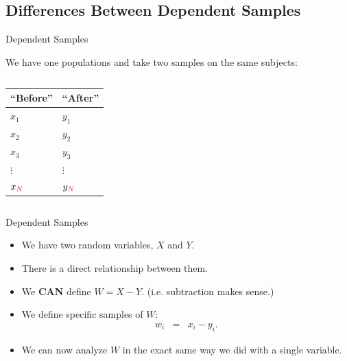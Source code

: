 \subsection{Differences Between Dependent Samples}


\begin{frame}{Dependent Samples}

  We have one populations and take two samples on the same subjects: \\
  \begin{columns}
    \begin{tabular}{ll}
      ``Before'' & ``After'' \\ \hline
      $x_1$  & $y_1$ \\
      $x_2$  & $y_2$ \\
      $x_3$  & $y_3$ \\
      $\vdots$ & $\vdots$ \\
      $x_{{\color{red}N}}$ & $y_{{\color{red}N}}$  \\
    \end{tabular}
  \end{columns}


\end{frame}

\begin{frame}{Dependent Samples}

  \begin{itemize}
  \item We have two random variables, $X$ and $Y$.
  \item There is a direct relationship between them.
  \item We \textbf{CAN} define $W=X-Y$. (i.e. subtraction makes
    sense.)
  \item We define specific samples of $W$:
    \begin{eqnarray*}
      w_i & = & x_i - y_i.
    \end{eqnarray*}
  \item We can now analyze $W$ in the exact same way we did with a
    single variable.
  \end{itemize}
  
\end{frame}

